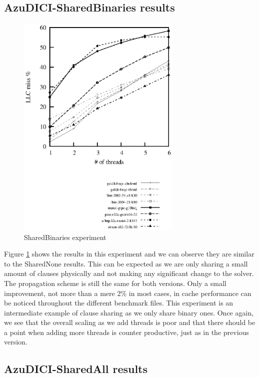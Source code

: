 \documentclass[12pt]{diicc}
\begin{document}
\subsection{AzuDICI-SharedBinaries results}

\begin{figure}[h!]
	\centering
		\includegraphics[width=0.7\textwidth]{shared-binaries}
	\caption{SharedBinaries experiment}
	\label{fig:shared-binaries}
\end{figure}

Figure \ref{fig:shared-binaries} shows the results in this experiment and we can observe they are similar to the SharedNone results. This can be expected as we are only sharing a small amount of clauses physically and not making any significant change to the solver. The propagation scheme is still the same for both versions. Only a small improvement, not more than a mere 2\% in most cases, in cache performance can be noticed throughout the different benchmark files. This experiment is an intermediate example of clause sharing as we only share binary ones. Once again, we see that the overall scaling as we add threads is poor and that there should be a point when adding more threads is counter productive, just as in the previous version.

\subsection{AzuDICI-SharedAll results}
\end{document}

